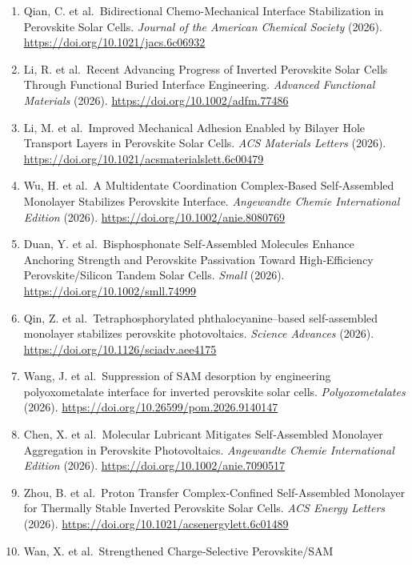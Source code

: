 \documentclass[
  11pt,
]{article}
\begin{document}
\begin{enumerate}
  Gao, D. et al.~n-Type polymer layers enable efficient, scalable, and
  thermally stable perovskite solar modules. \emph{Science} (2026).
  \url{https://doi.org/10.1126/science.aed8175}
\item
  Qian, C. et al.~Bidirectional Chemo-Mechanical Interface Stabilization
  in Perovskite Solar Cells. \emph{Journal of the American Chemical
  Society} (2026). \url{https://doi.org/10.1021/jacs.6c06932}
\item
  Li, R. et al.~Recent Advancing Progress of Inverted Perovskite Solar
  Cells Through Functional Buried Interface Engineering. \emph{Advanced
  Functional Materials} (2026). \url{https://doi.org/10.1002/adfm.77486}
\item
  Li, M. et al.~Improved Mechanical Adhesion Enabled by Bilayer Hole
  Transport Layers in Perovskite Solar Cells. \emph{ACS Materials
  Letters} (2026).
  \url{https://doi.org/10.1021/acsmaterialslett.6c00479}
\item
  Wu, H. et al.~A Multidentate Coordination Complex‐Based Self‐Assembled
  Monolayer Stabilizes Perovskite Interface. \emph{Angewandte Chemie
  International Edition} (2026).
  \url{https://doi.org/10.1002/anie.8080769}
\item
  Duan, Y. et al.~Bisphosphonate Self‐Assembled Molecules Enhance
  Anchoring Strength and Perovskite Passivation Toward High‐Efficiency
  Perovskite/Silicon Tandem Solar Cells. \emph{Small} (2026).
  \url{https://doi.org/10.1002/smll.74999}
\item
  Qin, Z. et al.~Tetraphosphorylated phthalocyanine--based
  self-assembled monolayer stabilizes perovskite photovoltaics.
  \emph{Science Advances} (2026).
  \url{https://doi.org/10.1126/sciadv.aee4175}
\item
  Wang, J. et al.~Suppression of SAM desorption by engineering
  polyoxometalate interface for inverted perovskite solar cells.
  \emph{Polyoxometalates} (2026).
  \url{https://doi.org/10.26599/pom.2026.9140147}
\item
  Chen, X. et al.~Molecular Lubricant Mitigates Self‐Assembled Monolayer
  Aggregation in Perovskite Photovoltaics. \emph{Angewandte Chemie
  International Edition} (2026).
  \url{https://doi.org/10.1002/anie.7090517}
\item
  Zhou, B. et al.~Proton Transfer Complex-Confined Self-Assembled
  Monolayer for Thermally Stable Inverted Perovskite Solar Cells.
  \emph{ACS Energy Letters} (2026).
  \url{https://doi.org/10.1021/acsenergylett.6c01489}
\item
  Wan, X. et al.~Strengthened Charge‐Selective Perovskite/SAM

\end{enumerate}
\end{document}
